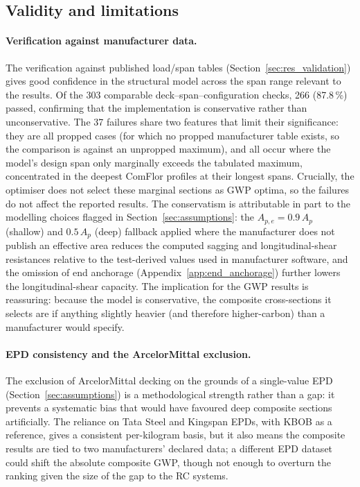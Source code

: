 \subsection{Validity and limitations}
\label{sec:disc_method}
\paragraph{Verification against manufacturer data.} The verification against published load/span tables (Section~\ref{sec:res_validation}) gives good confidence in the structural model across the span range relevant to the results. Of the 303 comparable deck--span--configuration checks, 266 (87.8\,\%) passed, confirming that the implementation is conservative rather than unconservative. The 37 failures share two features that limit their significance: they are all propped cases (for which no propped manufacturer table exists, so the comparison is against an unpropped maximum), and all occur where the model's design span only marginally exceeds the tabulated maximum, concentrated in the deepest ComFlor profiles at their longest spans. Crucially, the optimiser does not select these marginal sections as GWP optima, so the failures do not affect the reported results. The conservatism is attributable in part to the modelling choices flagged in Section~\ref{sec:assumptions}: the $A_{p,e}=0.9\,A_p$ (shallow) and $0.5\,A_p$ (deep) fallback applied where the manufacturer does not publish an effective area reduces the computed sagging and longitudinal-shear resistances relative to the test-derived values used in manufacturer software, and the omission of end anchorage (Appendix~\ref{app:end_anchorage}) further lowers the longitudinal-shear capacity. The implication for the GWP results is reassuring: because the model is conservative, the composite cross-sections it selects are if anything slightly heavier (and therefore higher-carbon) than a manufacturer would specify.

\paragraph{EPD consistency and the ArcelorMittal exclusion.} The exclusion of ArcelorMittal decking on the grounds of a single-value EPD (Section~\ref{sec:assumptions}) is a methodological strength rather than a gap: it prevents a systematic bias that would have favoured deep composite sections artificially. The reliance on Tata Steel and Kingspan EPDs, with KBOB as a reference, gives a consistent per-kilogram basis, but it also means the composite results are tied to two manufacturers' declared data; a different EPD dataset could shift the absolute composite GWP, though not enough to overturn the ranking given the size of the gap to the RC systems.

